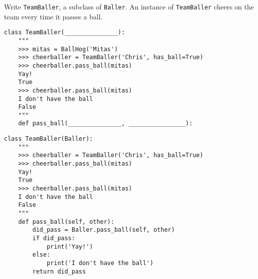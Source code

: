 \begin{blocksection}
\question Write \lstinline$TeamBaller$, a subclass of \lstinline$Baller$. An instance of \lstinline$TeamBaller$ cheers on the team every time it passes a ball.

\ifprintanswers\else
\begin{lstlisting}
class TeamBaller(_______________):
    """
    >>> mitas = BallHog('Mitas')
    >>> cheerballer = TeamBaller('Chris', has_ball=True)
    >>> cheerballer.pass_ball(mitas)
    Yay!
    True
    >>> cheerballer.pass_ball(mitas)
    I don't have the ball
    False
    """
    def pass_ball(_______________, ________________):
\end{lstlisting}
\fi

\begin{solution}[1in]
\begin{lstlisting}
class TeamBaller(Baller):
    """
    >>> cheerballer = TeamBaller('Chris', has_ball=True)
    >>> cheerballer.pass_ball(mitas)
    Yay!
    True
    >>> cheerballer.pass_ball(mitas)
    I don't have the ball
    False
    """
    def pass_ball(self, other):
        did_pass = Baller.pass_ball(self, other)
        if did_pass:
            print('Yay!')
        else:
            print('I don't have the ball')
        return did_pass
\end{lstlisting}
\end{solution}
\end{blocksection}
